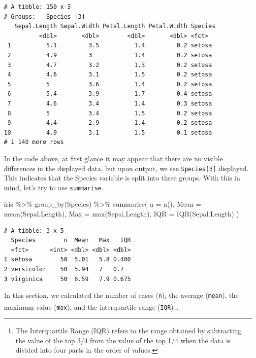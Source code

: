 \documentclass[
  a4paper,
]{book}
\newenvironment{Shaded}{\begin{snugshade}}{\end{snugshade}}
\newcommand{\AttributeTok}[1]{\textcolor[rgb]{0.40,0.45,0.13}{#1}}
\newcommand{\FunctionTok}[1]{\textcolor[rgb]{0.28,0.35,0.67}{#1}}
\newcommand{\NormalTok}[1]{\textcolor[rgb]{0.00,0.23,0.31}{#1}}
\newcommand{\SpecialCharTok}[1]{\textcolor[rgb]{0.37,0.37,0.37}{#1}}
\begin{document}
\begin{verbatim}
# A tibble: 150 x 5
# Groups:   Species [3]
   Sepal.Length Sepal.Width Petal.Length Petal.Width Species
          <dbl>       <dbl>        <dbl>       <dbl> <fct>  
 1          5.1         3.5          1.4         0.2 setosa 
 2          4.9         3            1.4         0.2 setosa 
 3          4.7         3.2          1.3         0.2 setosa 
 4          4.6         3.1          1.5         0.2 setosa 
 5          5           3.6          1.4         0.2 setosa 
 6          5.4         3.9          1.7         0.4 setosa 
 7          4.6         3.4          1.4         0.3 setosa 
 8          5           3.4          1.5         0.2 setosa 
 9          4.4         2.9          1.4         0.2 setosa 
10          4.9         3.1          1.5         0.1 setosa 
# i 140 more rows
\end{verbatim}

In the code above, at first glance it may appear that there are no
visible differences in the displayed data, but upon output, we see
\texttt{Species{[}3{]}} displayed. This indicates that the Species
variable is split into three groups. With this in mind, let's try to use
\texttt{summarise}.

\begin{Shaded}
\begin{Highlighting}[]
\NormalTok{iris }\SpecialCharTok{\%\textgreater{}\%}
  \FunctionTok{group\_by}\NormalTok{(Species) }\SpecialCharTok{\%\textgreater{}\%}
  \FunctionTok{summarise}\NormalTok{(}
    \AttributeTok{n =} \FunctionTok{n}\NormalTok{(),}
    \AttributeTok{Mean =} \FunctionTok{mean}\NormalTok{(Sepal.Length),}
    \AttributeTok{Max =} \FunctionTok{max}\NormalTok{(Sepal.Length),}
    \AttributeTok{IQR =} \FunctionTok{IQR}\NormalTok{(Sepal.Length)}
\NormalTok{  )}
\end{Highlighting}
\end{Shaded}

\begin{verbatim}
# A tibble: 3 x 5
  Species        n  Mean   Max   IQR
  <fct>      <int> <dbl> <dbl> <dbl>
1 setosa        50  5.01   5.8 0.400
2 versicolor    50  5.94   7   0.7  
3 virginica     50  6.59   7.9 0.675
\end{verbatim}

In this section, we calculated the number of cases (\texttt{n}), the
average (\texttt{mean}), the maximum value (\texttt{max}), and the
interquartile range (\texttt{IQR})\footnote{The Interquartile Range
  (IQR) refers to the range obtained by subtracting the value of the top
  3/4 from the value of the top 1/4 when the data is divided into four
  parts in the order of values.}.
\end{document}
